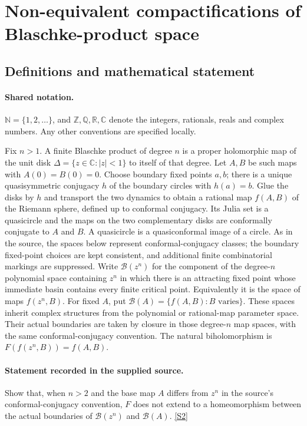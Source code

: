 \documentclass[11pt]{article}
\newcommand{\sref}[2]{\hyperlink{source:#1:#2}{[S#2]}}
\begin{document}
\section{Non-equivalent compactifications of Blaschke-product space}\label{statement}

\subsection{Definitions and mathematical statement}

\paragraph{Shared notation.}$\mathbb N=\{1,2,\ldots\}$, and $\mathbb Z,\mathbb Q,\mathbb R,\mathbb C$ denote the integers, rationals, reals and complex numbers. Any other conventions are specified locally.


Fix $n>1$. A finite Blaschke product of degree $n$ is a proper holomorphic map of the unit disk $\Delta=\{z\in\mathbb C:|z|<1\}$ to itself of that degree. Let $A,B$ be such maps with $A(0)=B(0)=0$. Choose boundary fixed points $a,b$; there is a unique quasisymmetric conjugacy $h$ of the boundary circles with $h(a)=b$. Glue the disks by $h$ and transport the two dynamics to obtain a rational map $f(A,B)$ of the Riemann sphere, defined up to conformal conjugacy. Its Julia set is a quasicircle and the maps on the two complementary disks are conformally conjugate to $A$ and $B$. A quasicircle is a quasiconformal image of a circle. As in the source, the spaces below represent conformal-conjugacy classes; the boundary fixed-point choices are kept consistent, and additional finite combinatorial markings are suppressed.
Write $\mathcal B(z^n)$ for the component of the degree-$n$ polynomial space containing $z^n$ in which there is an attracting fixed point whose immediate basin contains every finite critical point. Equivalently it is the space of maps $f(z^n,B)$. For fixed $A$, put $\mathcal B(A)=\{f(A,B):B\text{ varies}\}$. These spaces inherit complex structures from the polynomial or rational-map parameter space. Their actual boundaries are taken by closure in those degree-$n$ map spaces, with the same conformal-conjugacy convention. The natural biholomorphism is $F(f(z^n,B))=f(A,B)$.
\paragraph{Statement recorded in the supplied source.}
Show that, when $n>2$ and the base map $A$ differs from $z^n$ in the source's conformal-conjugacy convention, $F$ does not extend to a homeomorphism between the actual boundaries of $\mathcal B(z^n)$ and $\mathcal B(A)$. \sref{statement}{2}
\end{document}
